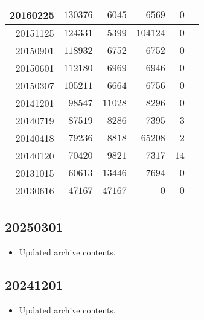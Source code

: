 \documentclass[hidelinks,a4paper,12pt]{article}
\begin{document}
\begin{center}
\begin{tabular}{|r|r|r|r|r|r|}
20160225         & $130376$         & $6045$         & $6569$           & $0$              \\ \hline
20151125         & $124331$         & $5399$         & $104124$         & $0$              \\ \hline
20150901         & $118932$         & $6752$         & $6752$           & $0$              \\ \hline
20150601         & $112180$         & $6969$         & $6946$           & $0$              \\ \hline
20150307         & $105211$         & $6664$         & $6756$           & $0$              \\ \hline
20141201         & $98547$          & $11028$        & $8296$           & $0$              \\ \hline
20140719         & $87519$          & $8286$         & $7395$           & $3$              \\ \hline
20140418         & $79236$          & $8818$         & $65208$          & $2$              \\ \hline
20140120         & $70420$          & $9821$         & $7317$           & $14$             \\ \hline
20131015         & $60613$          & $13446$        & $7694$           & $0$              \\ \hline
20130616         & $47167$          & $47167$        & $0$              & $0$              \\ \hline
\end{tabular}
\end{center}

\subsection{20250301}  \label{sec:changelog_20250301}

\begin{itemize}
\item Updated archive contents.
\end{itemize}

\subsection{20241201}  \label{sec:changelog_20241201}

\begin{itemize}
\item Updated archive contents.
\end{itemize}
\end{document}
